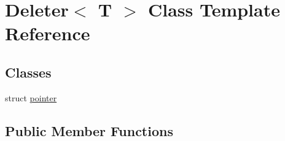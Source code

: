 \hypertarget{struct_deleter}{}\section{Deleter$<$ T $>$ Class Template Reference}
\label{struct_deleter}
\subsection*{Classes}
\begin{DoxyCompactItemize}
\item 
struct \mbox{\hyperlink{struct_deleter_1_1pointer}{pointer}}
\end{DoxyCompactItemize}
\subsection*{Public Member Functions}
